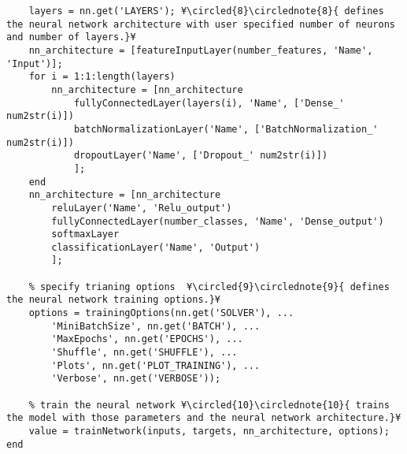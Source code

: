 \documentclass{tufte-handout}
\begin{document}
\begin{lstlisting}
    layers = nn.get('LAYERS'); ¥\circled{8}\circlednote{8}{ defines the neural network architecture with user specified number of neurons and number of layers.}¥
    nn_architecture = [featureInputLayer(number_features, 'Name', 'Input')];
    for i = 1:1:length(layers)
        nn_architecture = [nn_architecture
            fullyConnectedLayer(layers(i), 'Name', ['Dense_' num2str(i)])
            batchNormalizationLayer('Name', ['BatchNormalization_' num2str(i)])
            dropoutLayer('Name', ['Dropout_' num2str(i)])
            ];
    end
    nn_architecture = [nn_architecture
        reluLayer('Name', 'Relu_output')
        fullyConnectedLayer(number_classes, 'Name', 'Dense_output')
        softmaxLayer
        classificationLayer('Name', 'Output')
        ];

    % specify trianing options  ¥\circled{9}\circlednote{9}{ defines the neural network training options.}¥
    options = trainingOptions(nn.get('SOLVER'), ...
        'MiniBatchSize', nn.get('BATCH'), ...
        'MaxEpochs', nn.get('EPOCHS'), ...
        'Shuffle', nn.get('SHUFFLE'), ...
        'Plots', nn.get('PLOT_TRAINING'), ...
        'Verbose', nn.get('VERBOSE'));

    % train the neural network ¥\circled{10}\circlednote{10}{ trains the model with those parameters and the neural network architecture.}¥
    value = trainNetwork(inputs, targets, nn_architecture, options);
end


\end{lstlisting}
\end{document}
